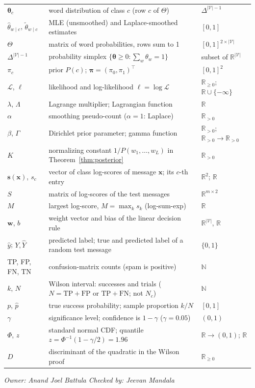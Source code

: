 \documentclass[11pt]{article}
\newcommand{\owner}[2]{\par\noindent\textit{Owner: #1 \hfill Checked by: #2}\par\medskip}
\theoremstyle{plain}
\theoremstyle{definition}
\newcommand{\R}{\mathbb{R}}
\newcommand{\N}{\mathbb{N}}
\newcommand{\Vs}{|\mathcal{V}|}
\newcommand{\bx}{\mathbf{x}}
\newcommand{\bw}{\mathbf{w}}
\begin{document}
\begin{center}
\begin{tabularx}{\textwidth}{@{}l X l@{}}
$\boldsymbol\theta_c$ & word distribution of class $c$ (row $c$ of $\Theta$) & $\Delta^{\Vs-1}$\\
$\hat\theta_{w\mid c}$, $\tilde\theta_{w\mid c}$ & MLE (unsmoothed) and Laplace-smoothed estimates & $[0,1]$\\
$\Theta$ & matrix of word probabilities, rows sum to 1 & $[0,1]^{2\times\Vs}$\\
$\Delta^{\Vs-1}$ & probability simplex $\{\boldsymbol\theta\ge0:\sum_w\theta_w=1\}$ & subset of $\R^{\Vs}$\\
$\pi_c$ & prior $P(c)$; $\boldsymbol\pi=(\pi_0,\pi_1)^\top$ & $[0,1]^2$\\
$\mathcal L$, $\ell$ & likelihood and log-likelihood $\ell=\log\mathcal L$ & $\R_{\ge0}$; $\R\cup\{-\infty\}$\\
$\lambda$, $\Lambda$ & Lagrange multiplier; Lagrangian function & $\R$\\
$\alpha$ & smoothing pseudo-count ($\alpha=1$: Laplace) & $\R_{>0}$\\
$\beta$, $\Gamma$ & Dirichlet prior parameter; gamma function & $\R_{>0}$; $\R_{>0}\to\R_{>0}$\\
$K$ & normalizing constant $1/P(w_1,\dots,w_L)$ in Theorem~\ref{thm:posterior} & $\R_{>0}$\\
$\mathbf s(\bx)$, $s_c$ & vector of class log-scores of message $\bx$; its $c$-th entry & $\R^2$; $\R$\\
$S$ & matrix of log-scores of the test messages & $\R^{m\times 2}$\\
$M$ & largest log-score, $M=\max_k s_k$ (log-sum-exp) & $\R$\\
$\bw$, $b$ & weight vector and bias of the linear decision rule & $\R^{\Vs}$, $\R$\\
$\hat y$; $Y,\hat Y$ & predicted label; true and predicted label of a random test message & $\{0,1\}$\\
TP, FP, FN, TN & confusion-matrix counts (spam is positive) & $\N$\\
$k$, $N$ & Wilson interval: successes and trials ($N=\mathrm{TP}+\mathrm{FP}$ or $\mathrm{TP}+\mathrm{FN}$; not $N_c$) & $\N$\\
$p$, $\hat p$ & true success probability; sample proportion $k/N$ & $[0,1]$\\
$\gamma$ & significance level; confidence is $1-\gamma$ ($\gamma=0.05$) & $(0,1)$\\
$\Phi$, $z$ & standard normal CDF; quantile $z=\Phi^{-1}(1-\gamma/2)=1.96$ & $\R\to(0,1)$; $\R$\\
$D$ & discriminant of the quadratic in the Wilson proof & $\R_{\ge0}$\\
\bottomrule
\end{tabularx}
\end{center}
\owner{Anand Joel Battula}{Jeevan Mandala}
\end{document}
